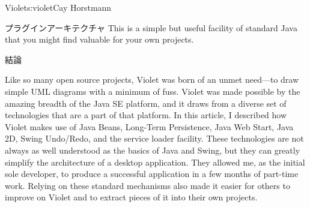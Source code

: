 \begin{aosachapter}{Violet}{s:violet}{Cay Horstmann}
\begin{aosasect1}{プラグインアーキテクチャ}
This is a simple but useful facility of standard Java that you might
find valuable for your own projects.

\end{aosasect1}

\begin{aosasect1}{結論}

Like so many open source projects, Violet was born of an unmet
need---to draw simple UML diagrams with a minimum of fuss. Violet was
made possible by the amazing breadth of the Java SE platform, and it
draws from a diverse set of technologies that are a part of that
platform. In this article, I described how Violet makes use of Java
Beans, Long-Term Persistence, Java Web Start, Java 2D, Swing
Undo/Redo, and the service loader facility.  These technologies are
not always as well understood as the basics of Java and Swing, but
they can greatly simplify the architecture of a desktop
application. They allowed me, as the initial sole developer, to
produce a successful application in a few months of part-time work.
Relying on these standard mechanisms also made it easier for others to
improve on Violet and to extract pieces of it into their own projects.

\end{aosasect1}

\end{aosachapter}
